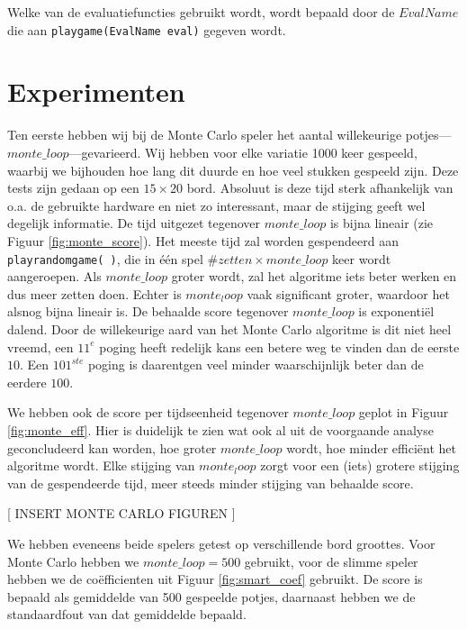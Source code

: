 \documentclass[10pt]{article}
\begin{document}
Welke van de evaluatiefuncties gebruikt wordt, wordt bepaald door de $EvalName$ die aan \verb+playgame(EvalName eval)+ gegeven wordt.

\section{Experimenten}

Ten eerste hebben wij bij de Monte Carlo speler het aantal willekeurige potjes---$monte\_loop$---gevarieerd. Wij hebben voor elke variatie 1000 keer gespeeld, waarbij we bijhouden hoe lang dit duurde en hoe veel stukken gespeeld zijn. Deze tests zijn gedaan op een $15 \times 20$ bord. Absoluut is deze tijd sterk afhankelijk van o.a. de gebruikte hardware en niet zo interessant, maar de stijging geeft wel degelijk informatie. De tijd uitgezet tegenover $monte\_loop$ is bijna lineair (zie Figuur \ref{fig:monte_score}). Het meeste tijd zal worden gespendeerd aan \verb+playrandomgame( )+, die in \'e\'en spel $\#zetten \times monte\_loop$ keer wordt aangeroepen. Als $monte\_loop$ groter wordt, zal het algoritme iets beter werken en dus meer zetten doen. Echter is $monte_loop$ vaak significant groter, waardoor het alsnog bijna lineair is. De behaalde score tegenover $monte\_loop$ is exponenti\"el dalend. Door de willekeurige aard van het Monte Carlo algoritme is dit niet heel vreemd, een $11^e$ poging heeft redelijk kans een betere weg te vinden dan de eerste $10$. Een $101^{ste}$ poging is daarentgen veel minder waarschijnlijk beter dan de eerdere $100$.


We hebben ook de score per tijdseenheid tegenover $monte\_loop$ geplot in Figuur \ref{fig:monte_eff}. Hier is duidelijk te zien wat ook al uit de voorgaande analyse geconcludeerd kan worden, hoe groter $monte\_loop$ wordt, hoe minder effici\"ent het algoritme wordt. Elke stijging van $monte_loop$ zorgt voor een (iets) grotere stijging van de gespendeerde tijd, meer steeds minder stijging van behaalde score.

[ INSERT MONTE CARLO FIGUREN ]

We hebben eveneens beide spelers getest op verschillende bord groottes. Voor Monte Carlo hebben we $monte\_loop = 500$ gebruikt, voor de slimme speler hebben we de co\"efficienten uit Figuur \ref{fig:smart_coef} gebruikt. De score is bepaald als gemiddelde van 500 gespeelde potjes, daarnaast hebben we de standaardfout van dat gemiddelde bepaald.
\end{document}
